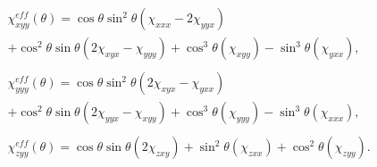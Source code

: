 \begin{equation}\label{eq:results:OAinPlanarNanohelices:ChiEff}
	\begin{split}
		&\chi_{xyy}^{eff}(\theta) = \cos\theta\sin^2\theta(\chi_{xxx} - 2\chi_{yyx}) \\
		&+ {\cos^2}\theta\sin\theta (2\chi _{xyx} - \chi_{yyy}) + {\cos^3}\theta(\chi_{xyy}) - {\sin^3}\theta(\chi _{yxx}), \\
		\\
		&\chi_{yyy}^{eff}(\theta) = \cos\theta\sin^2\theta(2\chi_{xyx} - \chi_{yxx}) \\
		&+ {\cos^2}\theta\sin\theta (2\chi _{yyx} - \chi_{xyy}) + {\cos^3}\theta(\chi_{yyy}) - {\sin^3}\theta(\chi _{xxx}), \\
		\\
		&\chi _{zyy}^{eff}(\theta) = \cos\theta\sin\theta (2\chi_{zxy}) + {\sin^2}\theta(\chi_{zxx}) + {\cos^2}\theta (\chi_{zyy}).
	\end{split}
\end{equation}

